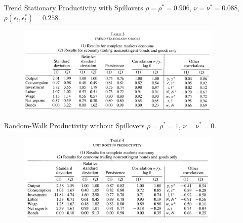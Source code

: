 \documentclass[10pt]{beamer}
\begin{document}
\begin{frame}{Trend Stationary Productivity with Spillovers}
$\rho=\rho^*=0.906$, $\nu=\nu^*=0.088$, $\rho(\epsilon_t,\epsilon_t^*)=0.258$.
\begin{figure}[thbp]
  \centering
  \includegraphics[width=0.90\textwidth]{6.png}
\end{figure}
\end{frame}

\begin{frame}{Random-Walk Productivity without Spillovers}
$\rho=\rho^*=1$, $\nu=\nu^*=0$.
\begin{figure}[thbp]
  \centering
  \includegraphics[width=0.90\textwidth]{7.png}
\end{figure}
\end{frame}
\end{document}
